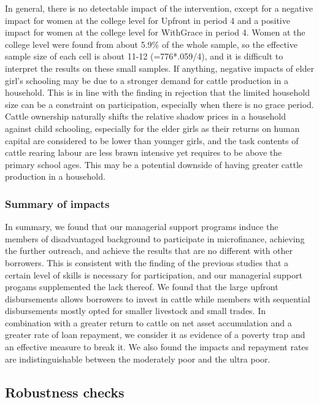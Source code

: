 	In general, there is no detectable impact of the intervention, except for a negative impact for women at the college level for \textsf{Upfront} in period 4 and a positive impact for women at the college level for \textsf{WithGrace} in period 4. Women at the college level were found from about 5.9\% of the whole sample, so the effective sample size of each cell is about 11-12 (=776*.059/4), and it is difficult to interpret the results on these small samples. If anything, negative impacts of elder girl's schooling may be due to a stronger demand for cattle production in a household. This is in line with the finding in rejection that the limited household size can be a constraint on participation, especially when there is no grace period. Cattle ownership naturally shifts the relative shadow prices in a household against child schooling, especially for the elder girls as their returns on human capital are considered to be lower than younger girls, and the task contents of cattle rearing labour are less brawn intensive yet requires to be above the primary school ages. This may be a potential downside of having greater cattle production in a household.

\subsubsection{Summary of impacts}

	In summary, we found that our managerial support programs induce the members of disadvantaged background to participate in microfinance, achieving the further outreach, and achieve the results that are no different with other borrowers. This is consistent with the finding of the previous studies that a certain level of skills is necessary for participation, and our managerial support progams supplemented the lack thereof. We found that the large upfront disbursements allows borrowers to invest in cattle while members with sequential disbursements mostly opted for smaller livestock and small trades. In combination with a greater return to cattle on net asset accumulation and a greater rate of loan repayment, we consider it as evidence of a poverty trap and an effective measure to break it. We also found the impacts and repayment rates are indistinguishable between the moderately poor and the ultra poor.


\subsection{Robustness checks}
\label{subsec RobustnessCheck}


